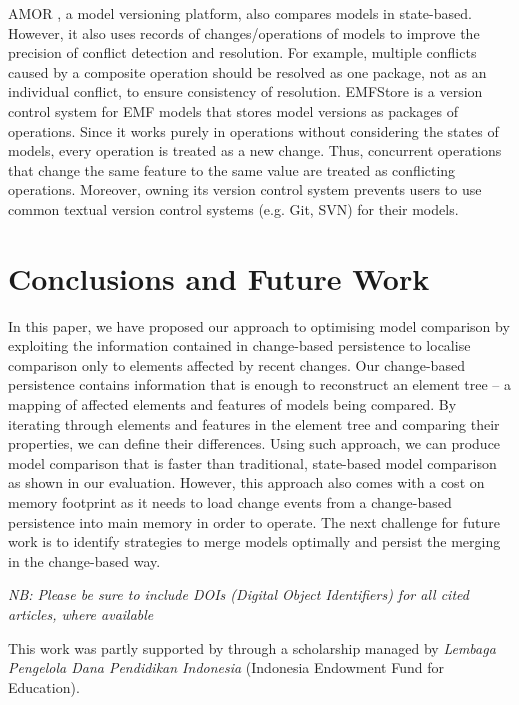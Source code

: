 \documentclass{jot}
\begin{document}
AMOR \cite{DBLP:conf/sfm/BroschKLSWW12}, a model versioning platform, also compares models in state-based. However, it also uses records of changes/operations of models to improve the precision of conflict detection and resolution. For example, multiple conflicts caused by a composite operation should be resolved as one package, not as an individual conflict, to ensure consistency of resolution. EMFStore \cite{koegel2010emfstore} is a version control system for EMF models that stores model versions as packages of operations. Since it works purely in operations without considering the states of models, every operation is treated as a new change. Thus, concurrent operations that change the same feature to the same value are treated as conflicting operations. Moreover, owning its version control system prevents users to use common textual version control systems (e.g. Git, SVN) for their models.  


\section{Conclusions and Future Work}
\label{sec:conclusion_and_future_work}
In this paper, we have proposed our approach to optimising model comparison by exploiting the information contained in change-based persistence to localise comparison only to elements affected by recent changes. Our change-based persistence contains information that is enough to reconstruct an element tree -- a mapping of affected elements and features of models being compared. By iterating through elements and features in the element tree and comparing their properties, we can define their differences. Using such approach, we can produce model comparison that is faster than traditional, state-based model comparison as shown in our evaluation. However, this approach also comes with a cost on memory footprint as it needs to load change events from a change-based persistence into main memory in order to operate. The next challenge for future work is to identify strategies to merge models optimally and persist the merging in the change-based way. 

\backmatter

\emph{NB: Please be sure to include DOIs (Digital Object Identifiers) for all cited articles, where available}




\abouttheauthors

\begin{acknowledgments}
This work was partly supported by through a scholarship managed by \emph{Lembaga Pengelola Dana Pendidikan Indonesia} (Indonesia Endowment Fund for Education).
\end{acknowledgments}
\end{document}
